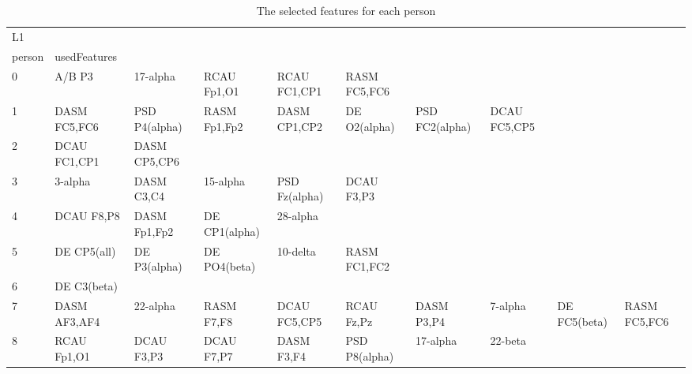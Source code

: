 \begin{landscape}
\begin{table}[]
\centering
\caption{The selected features for each person}
\begin{tabular}{l|llllllll}
L1       &                &                &                &                &                &                &                &                &               &              \\
person   & usedFeatures   &                &                &                &                &                &                &                &               &              \\
0        & A/B P3         & 17-alpha       & RCAU Fp1,O1    & RCAU FC1,CP1   & RASM FC5,FC6   &                &                &                &               &              \\
1        & DASM FC5,FC6   & PSD P4(alpha)  & RASM Fp1,Fp2   & DASM CP1,CP2   & DE O2(alpha)   & PSD FC2(alpha) & DCAU FC5,CP5   &                &               &              \\
2        & DCAU FC1,CP1   & DASM CP5,CP6   &                &                &                &                &                &                &               &              \\
3        & 3-alpha        & DASM C3,C4     & 15-alpha       & PSD Fz(alpha)  & DCAU F3,P3     &                &                &                &               &              \\
4        & DCAU F8,P8     & DASM Fp1,Fp2   & DE CP1(alpha)  & 28-alpha       &                &                &                &                &               &              \\
5        & DE CP5(all)    & DE P3(alpha)   & DE PO4(beta)   & 10-delta       & RASM FC1,FC2   &                &                &                &               &              \\
6        & DE C3(beta)    &                &                &                &                &                &                &                &               &              \\
7        & DASM AF3,AF4   & 22-alpha       & RASM F7,F8     & DCAU FC5,CP5   & RCAU Fz,Pz     & DASM P3,P4     & 7-alpha        & DE FC5(beta)   & RASM FC5,FC6  &              \\
8        & RCAU Fp1,O1    & DCAU F3,P3     & DCAU F7,P7     & DASM F3,F4     & PSD P8(alpha)  & 17-alpha       & 22-beta        &                &               &              \\

\end{tabular}
\end{table}
\end{landscape}
